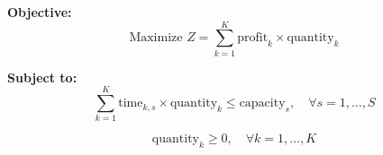 \documentclass{article}
\begin{document}
\textbf{Objective:}
\[
\text{Maximize } Z = \sum_{k=1}^{K} \text{profit}_{k} \times \text{quantity}_{k}
\]

\textbf{Subject to:}
\[
\sum_{k=1}^{K} \text{time}_{k, s} \times \text{quantity}_{k} \leq \text{capacity}_{s}, \quad \forall s = 1, \ldots, S
\]

\[
\text{quantity}_{k} \geq 0, \quad \forall k = 1, \ldots, K
\]
\end{document}
